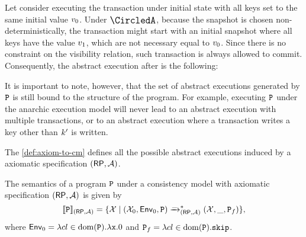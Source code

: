 
Let consider executing the transaction under initial state with all keys set to the same initial value \( v_0 \).
Under $\anarchicCM$, because the snapshot is chosen non-deterministically, 
the transaction might start with an initial snapshot where all keys have the value \( v_1 \),
which are not necessary equal to \( v_0 \).
Since there is no constraint on the visibility relation,
such transaction is always allowed to commit.
Consequently, the abstract execution after is the following: 
\begin{center}
\end{center}

It is important to note, however, that the set of abstract executions generated by $\mathtt{P}$ 
is still bound to the structure of the program.
For example, executing $\mathtt{P}$ under the anarchic execution model will never lead to 
an abstract execution with multiple transactions, 
or to an abstract execution where a transaction writes a key other than $k'$ is written.

The \cref{def:axiom-to-cm} defines all the possible abstract executions 
induced by a axiomatic specification $(\mathsf{RP}, \mathcal{A})$.

\begin{definition}
\label{def:axiom-to-cm}
\label{def:axiom-to-prog}
The semantics of a program $\mathtt{P}$ under a consistency model with axiomatic specification 
$(\mathsf{RP}, \mathcal{A})$ is given by 
\[
\llbracket \mathtt{P} \rrbracket_{(\mathsf{RP}, \mathcal{A})} = \{ \mathcal{X} \mid (\mathcal{X}_{0}, \mathsf{Env}_{0}, \mathtt{P}) \xrightarrow{\_}_{(\mathsf{RP}, \mathcal{A})}^{\ast} (\mathcal{X}, \_, \mathtt{P}_{f}) \}, 
\]
where $\mathsf{Env}_{0} = \lambda {\ensuremath{cl}} \in \operatorname{dom}(\mathtt{P}).\lambda \mathtt{x}.0$ and $\mathtt{P}_{f} = \lambda {\ensuremath{cl}} \in \operatorname{dom}(\mathtt{P}).\mathtt{skip}$.
\end{definition}

